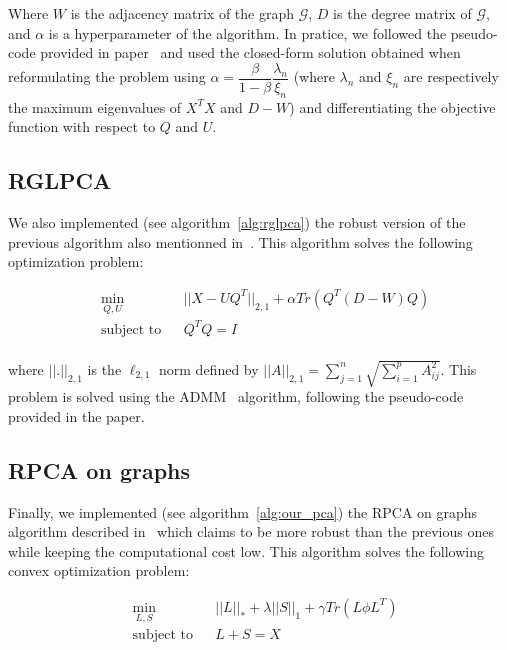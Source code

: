 \documentclass[sigconf]{acmart}
\begin{document}
  Where $W$ is the adjacency matrix of the graph $\mathcal{G}$, $D$ is the degree matrix of $\mathcal{G}$, and $\alpha$ is a hyperparameter of the algorithm. In pratice, we followed the pseudo-code provided in paper~\cite{glpca_paper} and used the closed-form solution obtained when reformulating the problem using $\alpha = \dfrac{\beta}{1 - \beta} \dfrac{\lambda_n}{\xi_n}$ (where $\lambda_n$ and $\xi_n$ are respectively the maximum eigenvalues of $X^TX$ and $D-W$) and differentiating the objective function with respect to $Q$ and $U$.

\subsection{RGLPCA}

We also implemented (see algorithm~\ref{alg:rglpca}) the robust version of the previous algorithm also mentionned in~\cite{glpca_paper}. This algorithm solves the following optimization problem:
  
  \begin{equation*}
    \begin{aligned}
    & \underset{Q, U}{\min}
    & & ||X - UQ^T||_{2, 1} + \alpha Tr(Q^T (D-W) Q) \\
    & \text{subject to}
    & & Q^TQ = I \\
    \end{aligned}
  \end{equation*}

  where $||.||_{2, 1}$ is the $\ell_{2, 1}$ norm defined by $||A||_{2, 1} = \displaystyle \sum\limits_{j=1}^n \sqrt{\sum \limits_{i=1}^p A_{ij}^2}$. This problem is solved using the ADMM~\cite{admm_paper} algorithm, following the pseudo-code provided in the paper.
  
\subsection{RPCA on graphs}

Finally, we implemented (see algorithm~\ref{alg:our_pca}) the RPCA on graphs algorithm described in~\cite{main_paper} which claims to be more robust than the previous ones while keeping the computational cost low. This algorithm solves the following convex optimization problem:
  
  \begin{equation*}
    \begin{aligned}
    & \underset{L, S}{\min}
    & & ||L||_* + \lambda ||S||_1 + \gamma Tr(L \phi L^T) \\
    & \text{subject to}
    & & L + S = X\\
    \end{aligned}
  \end{equation*}
\end{document}

